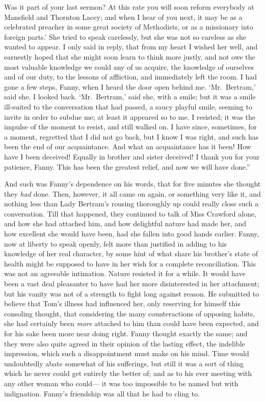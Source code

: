 Was it part of your last sermon?  At this rate you will
soon reform everybody at Mansfield and Thornton Lacey;
and when I hear of you next, it may be as a celebrated preacher
in some great society of Methodists, or as a missionary
into foreign parts.'  She tried to speak carelessly,
but she was not so careless as she wanted to appear.
I only said in reply, that from my heart I wished her well,
and earnestly hoped that she might soon learn to think
more justly, and not owe the most valuable knowledge we
could any of us acquire, the knowledge of ourselves and of
our duty, to the lessons of affliction, and immediately
left the room.  I had gone a few steps, Fanny, when I
heard the door open behind me.  `Mr.\ Bertram,' said she.
I looked back.  `Mr.\ Bertram,' said she, with a smile;
but it was a smile ill-suited to the conversation that
had passed, a saucy playful smile, seeming to invite
in order to subdue me; at least it appeared so to me.
I resisted; it was the impulse of the moment to resist,
and still walked on.  I have since, sometimes, for a moment,
regretted that I did not go back, but I know I was right,
and such has been the end of our acquaintance.  And what
an acquaintance has it been!  How have I been deceived!
Equally in brother and sister deceived!  I thank you for
your patience, Fanny.  This has been the greatest relief,
and now we will have done.''

And such was Fanny's dependence on his words, that for five
minutes she thought they \emph{had} done.  Then, however, it all
came on again, or something very like it, and nothing
less than Lady Bertram's rousing thoroughly up could
really close such a conversation.  Till that happened,
they continued to talk of Miss Crawford alone, and how she
had attached him, and how delightful nature had made her,
and how excellent she would have been, had she fallen into
good hands earlier.  Fanny, now at liberty to speak openly,
felt more than justified in adding to his knowledge
of her real character, by some hint of what share his
brother's state of health might be supposed to have in
her wish for a complete reconciliation.  This was not an
agreeable intimation.  Nature resisted it for a while.
It would have been a vast deal pleasanter to have had
her more disinterested in her attachment; but his vanity
was not of a strength to fight long against reason.
He submitted to believe that Tom's illness had influenced her,
only reserving for himself this consoling thought,
that considering the many counteractions of opposing habits,
she had certainly been \emph{more} attached to him than could
have been expected, and for his sake been more near
doing right.  Fanny thought exactly the same; and they were
also quite agreed in their opinion of the lasting effect,
the indelible impression, which such a disappointment
must make on his mind.  Time would undoubtedly abate
somewhat of his sufferings, but still it was a sort
of thing which he never could get entirely the better of;
and as to his ever meeting with any other woman who could---%
it was too impossible to be named but with indignation.
Fanny's friendship was all that he had to cling to.



